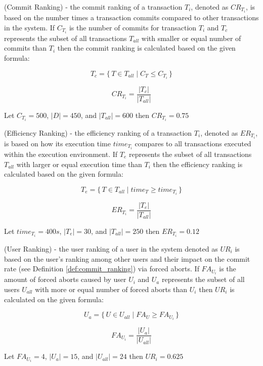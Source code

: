\begin{definition}
\label{def:commit_ranking}
(Commit Ranking) - the commit ranking of a transaction $T_{i}$, denoted as $CR_{T_{i}}$, is based on the number times a transaction commits compared to other transactions in the system. If $C_{T_{i}}$ is the number of commits for transaction $T_{i}$ and $T_{c}$ represents the subset of all transactions $T_{all}$ with smaller or equal number of commits than $T_{i}$ then the commit ranking is calculated based on the given formula: 
 
\[\textrm{$T_{c}$} = \{\, T\in \textrm{$T_{all}$} \mid \textrm{$C_{T} \leq C_{T_{i}}$} \,\}\]

\[\textrm{$CR_{T_{i}} = \frac{|T_{c}|}{|T_{all}|}$}\]

\begin{example}
Let $C_{T_{i}} = 500$, $|D| = 450$, and $|T_{all}| = 600$ then $CR_{T_{i}} = 0.75$
\end{example}
\end{definition}

\begin{definition}
\label{def:efficiency_ranking}
(Efficiency Ranking) - the efficiency ranking of a transaction $T_{i}$, denoted as $ER_{T_{i}}$, is based on how its execution time $time_{T_{i}}$ compares to all transactions executed within the execution environment. If $T_{e}$ represents the subset of all transactions $T_{all}$ with larger or equal execution time than $T_{i}$ then the efficiency ranking is calculated based on the given formula: 

\[\textrm{$T_{e}$} = \{\, T\in \textrm{$T_{all}$} \mid \textrm{$time_{T} \geq time_{T_{i}}$} \,\}\]

\[\textrm{$ER_{T_{i}} = \frac{|T_{e}|}{|T_{all}|}$}\]

\begin{example}
Let $time_{T_{i}} = 400s$, $|T_{e}| = 30$, and $|T_{all}| = 250$ then $ER_{T_{i}} = 0.12$
\end{example}
\end{definition}

\begin{definition}
\label{def:user_ranking}
(User Ranking) - the user ranking of a user in the system denoted as $UR_{i}$ is based on the user's ranking among other users and their impact on the commit rate (see Definition \ref{def:commit_ranking}) via forced aborts. If $FA_{U_{i}}$ is the amount of forced aborts caused by user $U_{i}$ and $U_{a}$ represents the subset of all users $U_{all}$ with more or equal number of forced aborts than $U_{i}$ then $UR_{i}$ is calculated on the given formula:

\[\textrm{$U_{a}$} = \{\, U\in \textrm{$U_{all}$} \mid \textrm{$FA_{U} \geq FA_{U_{i}}$} \,\}\]

\[\textrm{$FA_{U_{i}} = \frac{|U_{a}|}{|U_{all}|}$}\]

\begin{example}
Let $FA_{U_{i}} = 4$, $|U_{a}| = 15$, and $|U_{all}| = 24$ then $UR_{i} = 0.625$
\end{example}
\end{definition}

